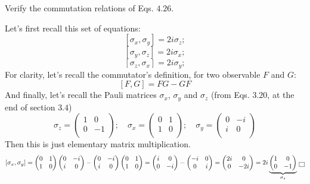 \documentclass[solutions.tex]{subfiles}
\begin{document}
\maketitle
\begin{exercise} Verify the commutation relations of Eqs. $4.26$.
\end{exercise}
Let's first recall this set of equations:
\[ [\sigma_x, \sigma_y] = 2i\sigma_z; \]
\[ [\sigma_y, \sigma_z] = 2i\sigma_x; \]
\[ [\sigma_z, \sigma_x] = 2i\sigma_y; \]
For clarity, let's recall the commutator's definition, for two
observable $F$ and $G$:
\[
	[F, G] = FG - GF
\]
And finally, let's recall the Pauli matrices $\sigma_x$, $\sigma_y$
and $\sigma_z$ (from Eqs. $3.20$, at the end of section $3.4$)
\[
	\sigma_z = \begin{pmatrix}
		1 & 0 \\
		0 & -1 \\
	\end{pmatrix};\quad
	\sigma_x = \begin{pmatrix}
		0 & 1 \\
		1 & 0 \\
	\end{pmatrix};\quad
	\sigma_y = \begin{pmatrix}
		0 & -i \\
		i & 0 \\
	\end{pmatrix}
\]
Then this is just elementary matrix multiplication.
\[
	[\sigma_x, \sigma_y] = \begin{pmatrix}
		0 & 1 \\
		1 & 0 \\
	\end{pmatrix}\begin{pmatrix}
		0 & -i \\
		i & 0 \\
	\end{pmatrix} - \begin{pmatrix}
		0 & -i \\
		i & 0 \\
	\end{pmatrix}\begin{pmatrix}
		0 & 1 \\
		1 & 0 \\
	\end{pmatrix} = \begin{pmatrix}
		i & 0 \\
		0 & -i \\
	\end{pmatrix} - \begin{pmatrix}
		-i & 0 \\
		0 & i \\
	\end{pmatrix} = \begin{pmatrix}
		2i & 0 \\
		0 & -2i \\
	\end{pmatrix} = 2i\underbrace{\begin{pmatrix}
		1 & 0 \\
		0 & -1 \\
	\end{pmatrix}}_{\sigma_z} \qed
\]
\end{document}
